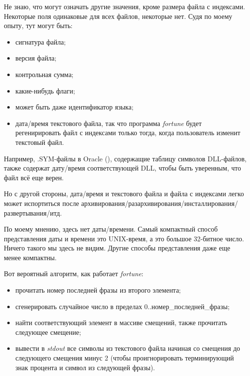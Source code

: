 \begin{figure}[H]
\centering
{}
\end{figure}

Не знаю, что могут означать другие значения, кроме размера файла с индексами.
Некоторые поля одинаковые для всех файлов, некоторые нет.
Судя по моему опыту, тут могут быть:

\begin{itemize}
\item сигнатура файла;
\item версия файла;
\item контрольная сумма;
\item какие-нибудь флаги;
\item может быть даже идентификатор языка;
\item дата/время текстового файла, так что программа \emph{fortune} будет регенирировать файл с индексами только тогда, когда
пользователь изменит текстовый файл.
\end{itemize}

Например, .SYM-файлы в Oracle (), содержащие таблицу символов DLL-файлов,
также содержат дату/время соответствующей DLL, чтобы быть уверенным, что файл всё еще верен.

Но с другой стороны, дата/время и текстового файла и файла с индексами легко может испортиться после
архивирования/разархивирования/инсталлирования/развертывания/итд.

По моему мнению, здесь нет даты/времени. Самый компактный способ представления даты и времени это UNIX-время,
а это большое 32-битное число. Ничего такого мы здесь не видим. Другие способы представления даже еще менее компактны.

Вот вероятный алгоритм, как работает \emph{fortune}:

\begin{itemize}
\item прочитать номер последней фразы из второго элемента;
\item сгенерировать случайное число в пределах 0..номер\_последней\_фразы;
\item найти соответствующий элемент в массиве смещений, также прочитать следующее смещение;
\item вывести в \emph{stdout} все символы из текстового файла начиная со смещения до следующего смещения минус 2 (чтобы
проигнорировать терминирующий знак процента и символ из следующей фразы).
\end{itemize}

